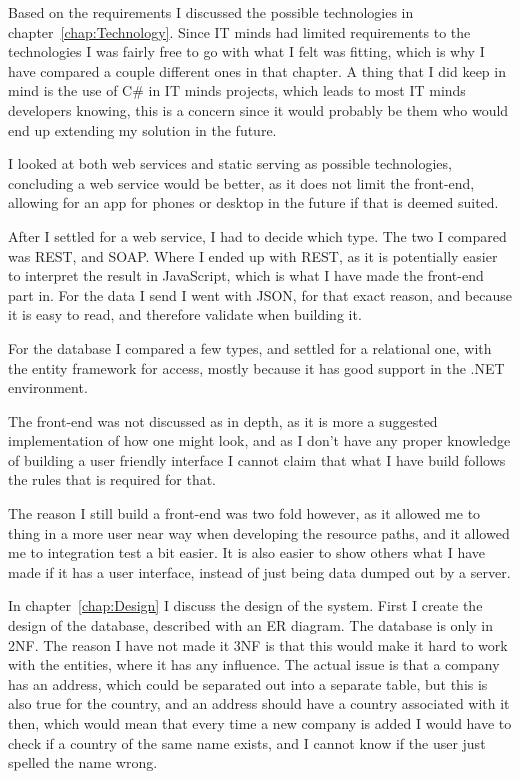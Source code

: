 Based on the requirements I discussed the possible technologies in
chapter~\ref{chap:Technology}. Since IT minds had limited requirements to the
technologies I was fairly free to go with what I felt was fitting, which is why
I have compared a couple different ones in that chapter. A thing that I did keep
in mind is the use of C\# in IT minds projects, which leads to most IT minds
developers knowing, this is a concern since it would probably be them who would
end up extending my solution in the future.

I looked at both web services and static serving as possible technologies,
concluding a web service would be better, as it does not limit the front-end,
allowing for an app for phones or desktop in the future if that is deemed suited.

After I settled for a web service, I had to decide which type. The two I
compared was REST, and SOAP. Where I ended up with REST, as it is potentially
easier to interpret the result in JavaScript, which is what I have made the
front-end part in. For the data I send  I went with JSON, for that exact reason,
and because it is easy to read, and therefore validate when building it.

For the database I compared a few types, and settled for a relational one, with
the entity framework for access, mostly because it has good support in the .NET
environment.

The front-end was not discussed as in depth, as it is more a suggested
implementation of how one might look, and as I don't have any proper knowledge
of building a user friendly interface I cannot claim that what I have build
follows the rules that is required for that. 

The reason I still build a front-end was two fold however, as it allowed me to
thing in a more user near way when developing the resource paths, and it allowed
me to integration test a bit easier. It is also easier to show others what I
have made if it has a user interface, instead of just being data dumped out by a server.

In chapter~\ref{chap:Design} I discuss the design of the system. First I create
the design of the database, described with an ER diagram. The database is only
in 2NF. The reason I have not made it 3NF is that this would make it hard to
work with the entities, where it has any influence. The actual issue is that a
company has an address, which could be separated out into a separate table, but
this is also true for the country, and an address should have a country
associated with it then, which would mean that every time a new company is added
I would have to check if a country of the same name exists, and I cannot know if
the user just spelled the name wrong.

